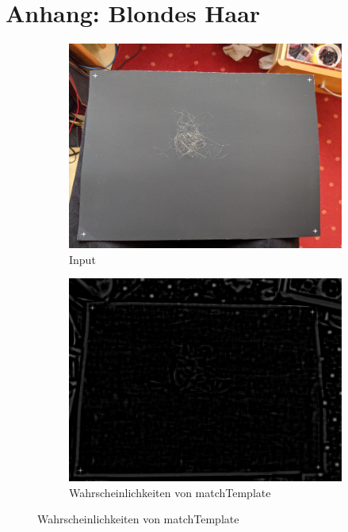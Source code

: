 \documentclass[german,a4paper, 12pt]{llncs}
\begin{document}
\section{Anhang: Blondes Haar}

\begin{figure}[H] %
	\begin{subfigure}{0.48\textwidth}
		\includegraphics[width=\linewidth]{figBina/01foundDots.png}
		\caption{Input} \label{fig:a}
	\end{subfigure}\hspace*{\fill}
	\begin{subfigure}{0.48\textwidth}
		\includegraphics[width=\linewidth]{figBina/02revRes.png}
		\caption{Wahrscheinlichkeiten von matchTemplate} \label{fig:b}
	\end{subfigure}
	

\end{figure}
\end{document}
